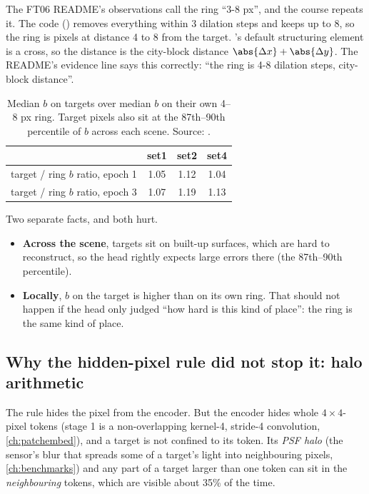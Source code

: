 \begin{sourcenote}
The FT06 README's observations call the ring ``3-8 px'', and the course repeats it. The code
() removes everything within 3 dilation steps and keeps up to 8, so the
ring is pixels at distance 4 to 8 from the target. 's default structuring element is a
cross, so the distance is the city-block distance $\abs{\Delta x}+\abs{\Delta y}$. The README's evidence line
says this correctly: ``the ring is 4-8 dilation steps, city-block distance''.
\end{sourcenote}

\begin{table}[htbp]
\centering
\begin{tabular}{lccc}
\toprule
 & set1 & set2 & set4\\
\midrule
target / ring $b$ ratio, epoch 1 & 1.05 & 1.12 & 1.04\\
target / ring $b$ ratio, epoch 3 & 1.07 & 1.19 & 1.13\\
\bottomrule
\end{tabular}
\caption{Median $b$ on targets over median $b$ on their own 4--8 px ring. Target pixels also sit at the 87th--90th
percentile of $b$ across each scene. Source: .}
\label{tab:uncertainty:ratio}
\end{table}

Two separate facts, and both hurt.
\begin{itemize}
\item \textbf{Across the scene}, targets sit on built-up surfaces, which are hard to reconstruct, so the head
  rightly expects large errors there (the 87th--90th percentile).
\item \textbf{Locally}, $b$ on the target is higher than on its own ring. That should not happen if the head only
  judged ``how hard is this kind of place'': the ring is the same kind of place.
\end{itemize}

\subsection{Why the hidden-pixel rule did not stop it: halo arithmetic}

The rule hides the pixel from the encoder. But the encoder hides whole $4\times4$-pixel tokens (stage 1 is a
non-overlapping kernel-4, stride-4 convolution, \cref{ch:patchembed}), and a target is not confined to its
token. Its \emph{PSF halo} (the sensor's blur that spreads some of a target's light into
neighbouring pixels, \cref{ch:benchmarks}) and any part of a target larger than one token can sit in the
\emph{neighbouring} tokens, which are visible about 35\% of the time.


